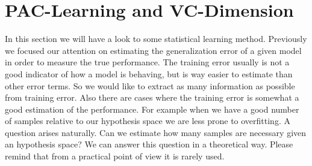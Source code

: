 \documentclass[../main.tex]{subfiles}
\begin{document}
\section{PAC-Learning and VC-Dimension}
In this section we will have a look to some statistical learning method.
Previously we focused our attention on estimating the generalization error of a given model in order to measure the true performance. The training error usually is not a good indicator of how a model is behaving, but is way easier to estimate than other error terms. So we would like to extract as many information as possible from training error. Also there are cases where the training error is somewhat a good estimation of the performance. For example when we have a good number of samples relative to our hypothesis space we are less prone to overfitting. A question arises naturally. Can we estimate how many samples are necessary given an hypothesis space? We can answer this question in a theoretical way. Please remind that from a practical point of view it is rarely used.
\end{document}
